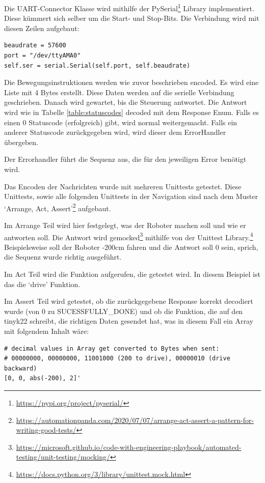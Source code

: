 Die UART-Connector Klasse  wird mithilfe der PySerial\footnote{\url{https://pypi.org/project/pyserial/}} Library implementiert. Diese kümmert sich selber um die Start- und Stop-Bits.
Die Verbindung wird mit diesen Zeilen aufgebaut:

\begin{verbatim}
beaudrate = 57600
port = "/dev/ttyAMA0"
self.ser = serial.Serial(self.port, self.beaudrate)
\end{verbatim}

Die Bewegungsinstruktionen werden wie zuvor beschrieben encoded. Es wird eine Liste mit 4 Bytes erstellt.
Diese Daten werden auf die serielle Verbindung geschrieben.
Danach wird gewartet, bis die Steuerung antwortet. Die Antwort wird wie in Tabelle \ref{table:statuscodes} decoded mit dem Response Enum.
Falls es einen 0 Statuscode (erfolgreich) gibt, wird normal weitergemacht. Falls ein anderer Statuscode zurückgegeben wird, wird dieser dem ErrorHandler übergeben.

Der Errorhandler führt die Sequenz aus, die für den jeweiligen Error benötigt wird.

Das Encoden der Nachrichten wurde mit mehreren Unittests getestet. Diese Unittests, sowie alle folgenden Unittests in der Navigation sind nach dem Muster `Arrange, Act, Assert'\footnote{\url{https://automationpanda.com/2020/07/07/arrange-act-assert-a-pattern-for-writing-good-tests/}} aufgebaut.

Im Arrange Teil wird hier festgelegt, was der Roboter machen soll und wie er antworten soll. Die Antwort wird gemocked\footnote{\url{https://microsoft.github.io/code-with-engineering-playbook/automated-testing/unit-testing/mocking/}} mithilfe von der Unittest Library.\footnote{\url{https://docs.python.org/3/library/unittest.mock.html}} Beispielsweise soll der Roboter -200cm fahren und die Antwort soll 0 sein, sprich, die Sequenz wurde richtig ausgeführt.

Im Act Teil wird die Funktion aufgerufen, die getestet wird. In diesem Beispiel ist das die `drive' Funktion.

Im Assert Teil wird getestet, ob die zurückgegebene Response korrekt decodiert wurde (von 0 zu SUCESSFULLY\_DONE) und ob die Funktion, die auf den \gls{tinyk22} schreibt, die richtigen Daten gesendet hat, was in diesem Fall ein Array mit folgendem Inhalt wäre:

\begin{verbatim}
# decimal values in Array get converted to Bytes when sent:
# 00000000, 00000000, 11001000 (200 to drive), 00000010 (drive backward)
[0, 0, abs(-200), 2]'
\end{verbatim}


